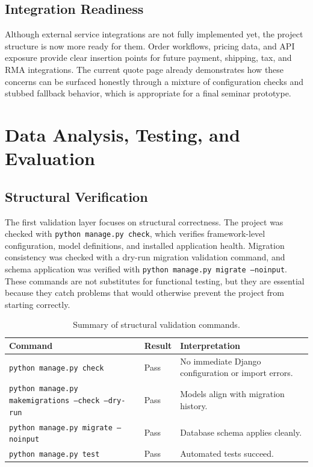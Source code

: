 \documentclass[12pt,letterpaper,oneside,openany]{book}
\begin{document}
\section{Integration Readiness}

\begin{justifying}
Although external service integrations are not fully implemented yet, the
project structure is now more ready for them. Order workflows, pricing data, and
API exposure provide clear insertion points for future payment, shipping, tax,
and RMA integrations. The current quote page already demonstrates how these
concerns can be surfaced honestly through a mixture of configuration checks and
stubbed fallback behavior, which is appropriate for a final seminar prototype.
\end{justifying}

\chapter{Data Analysis, Testing, and Evaluation}

\section{Structural Verification}

\begin{justifying}
The first validation layer focuses on structural correctness. The project was
checked with \texttt{python manage.py check}, which verifies framework-level
configuration, model definitions, and installed application health. Migration
consistency was checked with a dry-run migration validation command, and schema
application was verified with \texttt{python manage.py migrate --noinput}.
These commands are not substitutes
for functional testing, but they are essential because they catch problems that
would otherwise prevent the project from starting correctly.
\end{justifying}

\begin{table}[H]
\centering
\begin{tabular}{|p{2.8in}|p{0.8in}|p{2.2in}|}
\hline
\textbf{Command} & \textbf{Result} & \textbf{Interpretation} \\ \hline
\texttt{python manage.py check} & Pass & No immediate Django configuration or import errors. \\ \hline
\texttt{python manage.py makemigrations --check --dry-run} & Pass & Models align with migration history. \\ \hline
\texttt{python manage.py migrate --noinput} & Pass & Database schema applies cleanly. \\ \hline
\texttt{python manage.py test} & Pass & Automated tests succeed. \\ \hline
\end{tabular}
\caption{Summary of structural validation commands.}
\label{tab:validation_commands}
\end{table}
\end{document}
